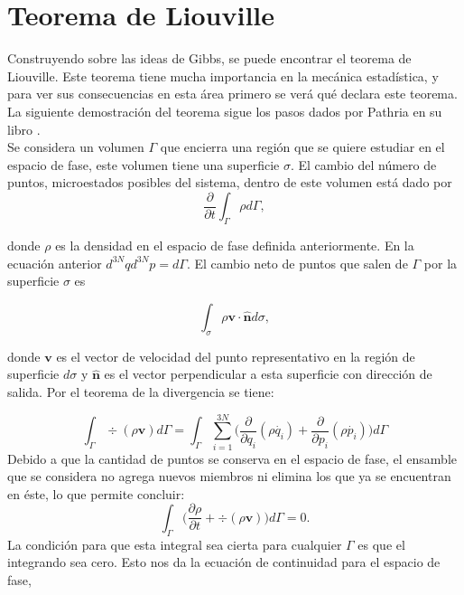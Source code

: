 \section{Teorema de Liouville }
Construyendo sobre las ideas de Gibbs, se puede encontrar el teorema de Liouville. Este teorema tiene mucha importancia en la mecánica estadística, y para ver sus consecuencias en esta área primero se verá qué declara este teorema. La siguiente demostración del teorema sigue los pasos dados por Pathria en su libro \cite{PathriaStat}. 
\\
Se considera un volumen $\Gamma$ que encierra una región que se quiere estudiar en el espacio de fase, este volumen tiene una superficie $\sigma$. El cambio del número de puntos, microestados posibles del sistema, dentro de este volumen está dado por 
\begin{equation}
\frac{\partial}{\partial t} \int_{\Gamma} \rho d\Gamma,
\end{equation}

donde $\rho$ es la densidad en el espacio de fase definida anteriormente. En la ecuación anterior $d^{3N}q d^{3N}p=d\Gamma$. 
El cambio neto de puntos que salen de $\Gamma$ por la superficie $\sigma$ es

\begin{equation}
\int_{\sigma} \rho \mathbf{v \cdot \hat{n}} d\sigma,
\end{equation}

donde $\mathbf{v}$ es el vector de velocidad del punto representativo en la región de superficie $d\sigma$ y $\mathbf{\hat{n}}$ es el vector perpendicular a esta superficie con dirección de salida. Por el teorema de la divergencia se tiene:

\begin{equation}
\int_{\Gamma} \div{ ( \rho\mathbf{v} ) } d\Gamma = \int_{\Gamma} \sum_{i=1}^{3N} \Big( \frac{\partial}{\partial q_{i}}(\rho \dot{q_{i}})+ \frac{\partial}{\partial p_{i}} (\rho \dot{p_{i}}) \Big) d\Gamma
\end{equation}
Debido a que la cantidad de puntos se conserva en el espacio de fase, el ensamble que se considera no agrega nuevos miembros ni elimina los que ya se encuentran en éste, lo que permite concluir:
\begin{equation}
 \int_{\Gamma} \Big( \frac{\partial \rho}{\partial t} + \div{ ( \rho\mathbf{v} ) } \Big) d\Gamma =0.
\end{equation}
La condición para que esta integral sea cierta para cualquier $\Gamma$ es que el integrando sea cero. Esto nos da la ecuación de continuidad para el espacio de fase,

